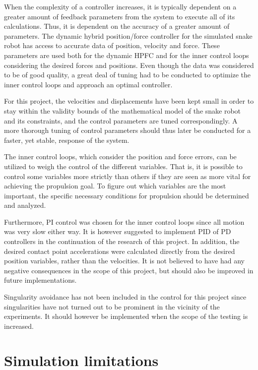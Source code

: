When the complexity of a controller increases, it is typically dependent on a greater amount of feedback parameters from the system to execute all of its calculations. Thus, it is dependent on the accuracy of a greater amount of parameters. The dynamic hybrid position/force controller for the simulated snake robot has access to accurate data of position, velocity and force. These parameters are used both for the dynamic HPFC and for the inner control loops considering the desired forces and positions. Even though the data was considered to be of good quality, a great deal of tuning had to be conducted to optimize the inner control loops and approach an optimal controller. 

For this project, the velocities and displacements have been kept small in order to stay within the validity bounds of the mathematical model of the snake robot and its constraints, and the control parameters are tuned correspondingly. A more thorough tuning of control parameters should thus later be conducted for a faster, yet stable, response of the system.

The inner control loops, which consider the position and force errors, can be utilized to weigh the control of the different variables. That is, it is possible to control some variables more strictly than others if they are seen as more vital for achieving the propulsion goal. To figure out which variables are the most important, the specific necessary conditions for propulsion should be determined and analyzed.

Furthermore, PI control was chosen for the inner control loops since all motion was very slow either way. It is however suggested to implement PID of PD controllers in the continuation of the research of this project. In addition, the desired contact point accelerations were calculated directly from the desired position variables, rather than the velocities. It is not believed to have had any negative consequences in the scope of this project, but should also be improved in future implementations.

Singularity avoidance has not been included in the control for this project since singularities have not turned out to be prominent in the vicinity of the experiments. It should however be implemented when the scope of the testing is increased.



\section{Simulation limitations}

